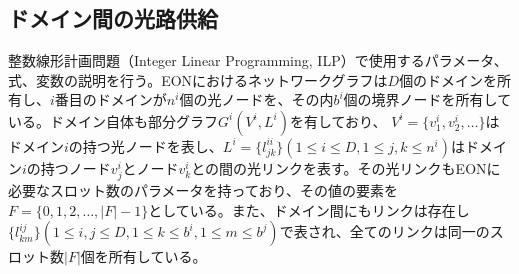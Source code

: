 \documentclass[a4j,twocolumn,fleqn]{jarticle}
\begin{document}
\subsection{ドメイン間の光路供給}
整数線形計画問題（Integer Linear Programming, ILP）で使用するパラメータ、式、変数の説明を行う。EONにおけるネットワークグラフは$D$個のドメインを所有し、$i$番目のドメインが$n^i$個の光ノードを、その内$b^i$個の境界ノードを所有している。ドメイン自体も部分グラフ$G^i (V^i ,L^i)$を有しており、 $V^i = \{v^i_1,v^i_2, \dots \} $はドメイン$i$の持つ光ノードを表し、$L^i = \{l^{ii}_{jk}\}(1\leq i \leq D,1\leq j,k \leq n^i)$はドメイン$i$の持つノード$v^i_j$とノード$v^i_k$との間の光リンクを表す。その光リンクもEONに必要なスロット数のパラメータを持っており、その値の要素を$F=\{0,1,2,\dots ,|F|-1\}$としている。また、ドメイン間にもリンクは存在し$\{l^{ij}_{km}\}(1\leq i,j\leq D,1\leq k\leq b^i,1\leq m \leq b^j)$で表され、全てのリンクは同一のスロット数$|F|$個を所有している。
\end{document}
